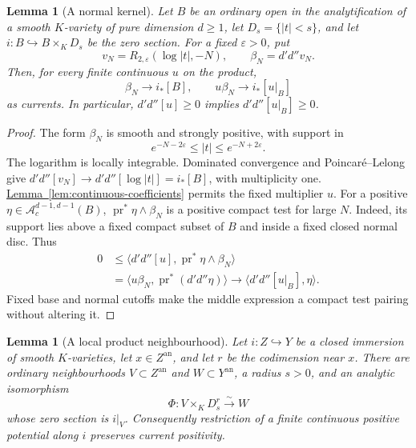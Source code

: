 \documentclass[11pt]{amsart}
\newtheorem{lemma}[theorem]{Lemma}
\theoremstyle{definition}
\theoremstyle{remark}
\numberwithin{equation}{section}
\newcommand{\ddc}{d'd''}
\newcommand{\an}{\mathrm{an}}
\newcommand{\Ac}{\mathcal A_c}
\newcommand{\namedref}[2]{%
 \begingroup
 \ifstrequal{#1}{Section}{\hypersetup{linkcolor=sectionteal}}{%
  \ifstrequal{#1}{Appendix}{\hypersetup{linkcolor=sectionteal}}{}}%
 \hyperref[#2]{#1~\ref*{#2}}%
 \endgroup}
\begin{document}
\begin{lemma}[A normal kernel]\label{lem:normal-kernel}
Let \(B\) be an ordinary open in the analytification of a smooth
\(K\)-variety of pure dimension \(d\geq1\), let
\(D_s=\{|t|<s\}\), and let \(i:B\hookrightarrow B\times_KD_s\)
be the zero section. For a fixed \(\varepsilon>0\), put
\[
 v_N=R_{2,\varepsilon}(\log|t|,-N),\qquad \beta_N=\ddc v_N.
\]
Then, for every finite continuous \(u\) on the product,
\[
 \beta_N\longrightarrow i_*[B],\qquad
 u\beta_N\longrightarrow i_*[u|_B]
\]
as currents. In particular, \(\ddc[u]\geq0\) implies
\(\ddc[u|_B]\geq0\).
\end{lemma}

\begin{proof}
The form \(\beta_N\) is smooth and strongly positive, with support in
\[
 e^{-N-2\varepsilon}\leq|t|\leq e^{-N+2\varepsilon}.
\]
The logarithm is locally integrable. Dominated convergence and
Poincar\'e--Lelong give
\(\ddc[v_N]\to\ddc[\log|t|]=i_*[B]\), with multiplicity one.
\namedref{Lemma}{lem:continuous-coefficients} permits the fixed multiplier \(u\).
For a positive \(\eta\in\Ac^{d-1,d-1}(B)\),
\(\operatorname{pr}^*\eta\wedge\beta_N\) is a positive compact test
for large \(N\). Indeed, its support lies above a fixed compact
subset of \(B\) and inside a fixed closed normal disc. Thus
\[
 \begin{aligned}
 0&\leq\langle\ddc[u],\operatorname{pr}^*\eta\wedge\beta_N\rangle\\
  &=\langle u\beta_N,\operatorname{pr}^*(\ddc\eta)\rangle
    \longrightarrow\langle\ddc[u|_B],\eta\rangle.
 \end{aligned}
\]
Fixed base and normal cutoffs make the middle expression a compact
test pairing without altering it.
\end{proof}

\begin{lemma}[A local product neighbourhood]\label{lem:tubular}
Let \(i:Z\hookrightarrow Y\) be a closed immersion of smooth
\(K\)-varieties, let \(x\in Z^\an\), and let \(r\) be the codimension
near \(x\). There are ordinary neighbourhoods \(V\subset Z^\an\)
and \(W\subset Y^\an\), a radius \(s>0\), and an analytic isomorphism
\[
 \Phi:V\times_KD_s^r\xrightarrow{\sim}W
\]
whose zero section is \(i|_V\). Consequently restriction of a finite
continuous positive potential along \(i\) preserves current positivity.
\end{lemma}
\end{document}
